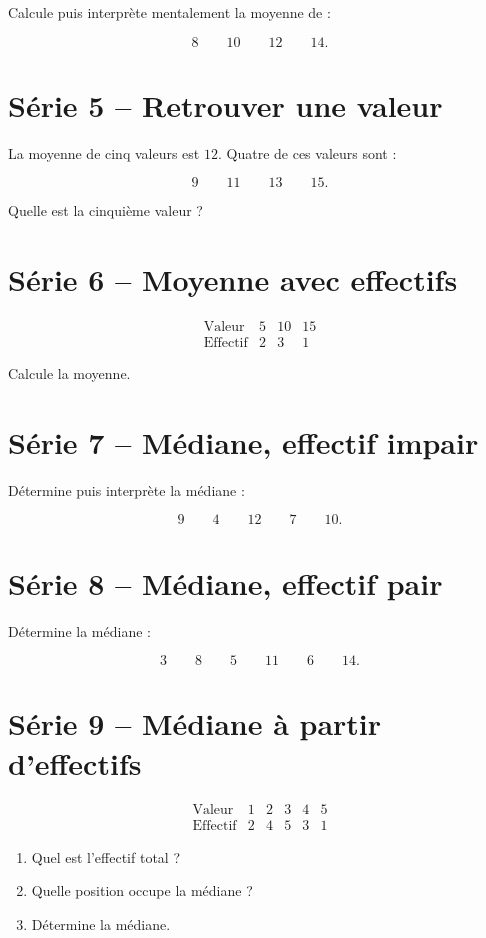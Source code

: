 \documentclass[12pt,a4paper]{article}
\begin{document}
Calcule puis interprète mentalement la moyenne de :

\[
8\qquad10\qquad12\qquad14.
\]

\section*{Série 5 -- Retrouver une valeur}

La moyenne de cinq valeurs est \(12\).
Quatre de ces valeurs sont :

\[
9\qquad11\qquad13\qquad15.
\]

Quelle est la cinquième valeur ?

\section*{Série 6 -- Moyenne avec effectifs}

\[
\begin{array}{c|ccc}
\text{Valeur} & 5 & 10 & 15\\
\hline
\text{Effectif} & 2 & 3 & 1
\end{array}
\]

Calcule la moyenne.

\section*{Série 7 -- Médiane, effectif impair}

Détermine puis interprète la médiane :

\[
9\qquad4\qquad12\qquad7\qquad10.
\]

\section*{Série 8 -- Médiane, effectif pair}

Détermine la médiane :

\[
3\qquad8\qquad5\qquad11\qquad6\qquad14.
\]

\section*{Série 9 -- Médiane à partir d'effectifs}

\[
\begin{array}{c|ccccc}
\text{Valeur} & 1 & 2 & 3 & 4 & 5\\
\hline
\text{Effectif} & 2 & 4 & 5 & 3 & 1
\end{array}
\]

\begin{enumerate}
  \item Quel est l'effectif total ?
  \item Quelle position occupe la médiane ?
  \item Détermine la médiane.
\end{enumerate}
\end{document}
